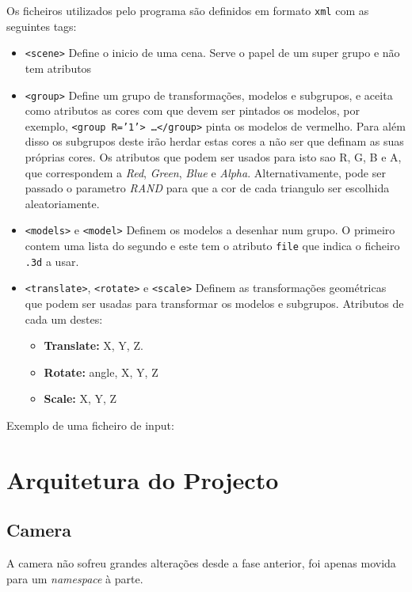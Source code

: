 \documentclass[a4paper]{article}
\begin{document}
Os ficheiros utilizados pelo programa são definidos em formato \texttt{xml} com as seguintes tags:
\begin{itemize}
    \item \texttt{<scene>} Define o inicio de uma cena. Serve o papel de um
        super grupo e não tem atributos
    \item \texttt{<group>} Define um grupo de transformações, modelos e
        subgrupos, e aceita como atributos as cores com que devem ser pintados
        os modelos, por exemplo,
        \texttt{<group R='1'> \ldots </group>} pinta os modelos de vermelho.
        Para além disso os subgrupos deste irão herdar estas cores a não ser
        que definam as suas próprias cores. Os atributos que podem ser usados
        para isto sao R, G, B e A, que correspondem a \textit{Red},
        \textit{Green}, \textit{Blue} e \textit{Alpha}. Alternativamente, pode ser passado
        o parametro \textit{RAND} para que a cor de cada triangulo ser
        escolhida aleatoriamente.
    \item \texttt{<models>} e \texttt{<model>} Definem os modelos a desenhar
        num grupo. O primeiro contem uma lista do segundo e este tem o atributo
        \texttt{file} que indica o ficheiro \texttt{.3d} a usar.
    \item \texttt{<translate>}, \texttt{<rotate>} e \texttt{<scale>} Definem as
        transformações geométricas que podem ser usadas para transformar os
        modelos e subgrupos. Atributos de cada um destes:
        \begin{itemize}
            \item \textbf{Translate:} X, Y, Z.
            \item \textbf{Rotate:} angle, X, Y, Z
            \item \textbf{Scale:} X, Y, Z
        \end{itemize}
\end{itemize}

Exemplo de uma ficheiro de input:


\section{Arquitetura do Projecto}

\subsection{Camera}

A camera não sofreu grandes alterações desde a fase anterior, foi apenas movida
para um \textit{namespace} à parte.
\end{document}
